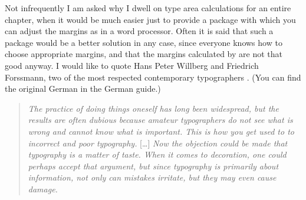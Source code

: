 Not infrequently I am asked why I dwell on type area
calculations for an entire chapter, when it would be much easier just to
provide a package with which you can adjust the margins as in a word
processor. Often it is said that such a package would be a better solution in
any case, since everyone knows how to choose appropriate margins, and that the
margins calculated by {\KOMAScript} are not that good anyway. I would like to
quote Hans Peter Willberg and Friedrich Forssmann, two of the most respected
contemporary typographers \cite{TYPO:ErsteHilfe}. (You can find the original
German in the German guide.)
\begin{quote}
  \textit{The practice of doing things oneself has long been
    widespread, but the results are often dubious because amateur typographers
    do not see what is wrong and cannot know what is important. This is how
    you get used to to incorrect and poor typography.} [\dots] \textit{Now the
    objection could be made that typography is a matter of taste. When it
    comes to decoration, one could perhaps accept that argument, but since
    typography is primarily about information, not only can mistakes irritate,
    but they may even cause damage.}
\end{quote}
%
\EndIndexGroup

